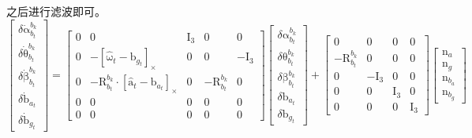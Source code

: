 \documentclass[12pt, onecolumn]{article}
\newcommand\liehat[1]{\left[ #1 \right]_\times}
\newcommand\bsm[1]{\boldsymbol{\mathrm{#1}}}
\newcommand\rotation[2]{{\bsm{R}_{#1}^{#2}}}
\begin{document}
	之后进行滤波即可。
	\begin{equation}
	\begin{bmatrix}
	\delta\dot{\bsm{\alpha}}_{b_{t}}^{b_k}
	\\
	\delta\dot{\bsm{\theta}}_{b_{t}}^{b_k}
	\\
	\delta\dot{\bsm{\beta}}_{b_{t}}^{b_k}
	\\
	\delta\dot{\bsm{b}}_{a_{t}}
	\\
	\delta\dot{\bsm{b}}_{g_{t}}
	\end{bmatrix}=
	\begin{bmatrix}
	0&0&\bsm{I}_3&0&0\\
	0&-\liehat{\hat{\bsm{\omega}}_t-\bsm{b}_{g_t}}&0&0&-\bsm{I}_3\\
	0&-\rotation{b_t}{b_{k}}\cdot\liehat{\hat{\bsm{a}}_t-\bsm{b}_{a_t}}&0&-\rotation{b_t}{b_{k}}&0\\
	0&0&0&0&0\\0&0&0&0&0
	\end{bmatrix}
	\begin{bmatrix}
	\delta{\bsm{\alpha}}_{b_{t}}^{b_k}
	\\
	\delta{\bsm{\theta}}_{b_{t}}^{b_k}
	\\
	\delta{\bsm{\beta}}_{b_{t}}^{b_k}
	\\
	\delta{\bsm{b}}_{a_{t}}
	\\
	\delta{\bsm{b}}_{g_{t}}
	\end{bmatrix}+
	\begin{bmatrix}
	0&0&0&0\\
	-\rotation{b_t}{b_{k}}&0&0&0\\
	0&-\bsm{I}_3&0&0\\
	0&0&\bsm{I}_3&0\\
	0&0&0&\bsm{I}_3
	\end{bmatrix}\begin{bmatrix}
	\bsm{n}_a\\\bsm{n}_g\\\bsm{n}_{b_a}\\\bsm{n}_{b_g}
	\end{bmatrix}
	\end{equation}
	
	
	
	
	
	
	
	
	
	
	
	
	
\end{document}
